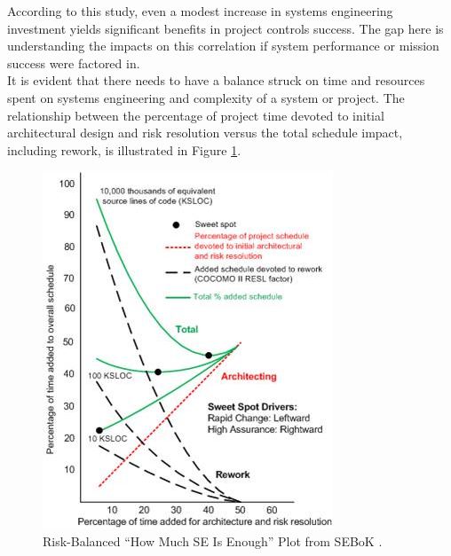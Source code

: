 According to this study, even a modest increase in systems engineering investment yields significant benefits in project controls success. 
The gap here is understanding the impacts on this correlation if system performance or mission success were factored in.\\
It is evident that there needs to have a balance struck on time and resources spent on systems engineering and complexity of a system or project\cite{sebok_economic_value}. 
The relationship between the percentage of project time devoted to initial architectural design and risk resolution versus the total schedule impact, including rework, is illustrated in Figure \ref{fig:enoughSE}. 
 
\begin{figure}[h!]
  \centering
  \includegraphics[width=0.7\linewidth]{figures/P1_EconValueSE_RiskBalancedfig2_BB.jpg}
  \caption{Risk-Balanced “How Much SE Is Enough” Plot from SEBoK
  \cite{sebok_economic_value}.}
  \label{fig:enoughSE}
\end{figure}

